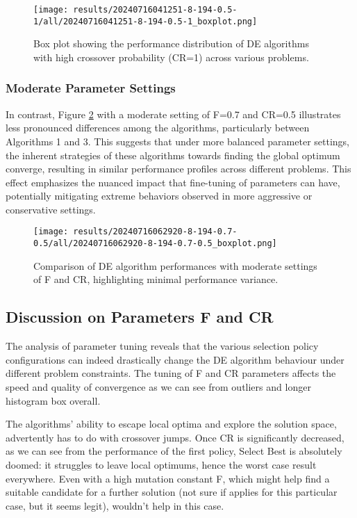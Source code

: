 \documentclass[12pt,a4paper]{article}
\begin{document}
\begin{figure}[h!]
    \centering
    \texttt{[image: results/20240716041251-8-194-0.5-1/all/20240716041251-8-194-0.5-1\_boxplot.png]}
    \caption{Box plot showing the performance distribution of DE algorithms with high crossover probability (CR=1) across various problems.}
    \label{fig:highCR}
\end{figure}

\subsubsection{Moderate Parameter Settings}
In contrast, Figure \ref{fig:moderateParams} with a moderate setting of F=0.7 and CR=0.5 illustrates less pronounced differences among the algorithms, particularly between Algorithms 1 and 3. This suggests that under more balanced parameter settings, the inherent strategies of these algorithms towards finding the global optimum converge, resulting in similar performance profiles across different problems. This effect emphasizes the nuanced impact that fine-tuning of parameters can have, potentially mitigating extreme behaviors observed in more aggressive or conservative settings.

\begin{figure}[h!]
    \centering
    \texttt{[image: results/20240716062920-8-194-0.7-0.5/all/20240716062920-8-194-0.7-0.5\_boxplot.png]}
    \caption{Comparison of DE algorithm performances with moderate settings of F and CR, highlighting minimal performance variance.}
    \label{fig:moderateParams}
\end{figure}

\subsection{Discussion on Parameters F and CR}
The analysis of parameter tuning reveals that the various selection policy configurations can indeed drastically change the DE algorithm behaviour under different problem constraints. The tuning of F and CR parameters affects the speed and quality of convergence as we can see from outliers and longer histogram box overall.

The algorithms' ability to escape local optima and explore the solution space, advertently has to do with crossover jumps. Once CR is significantly decreased, as we can see from the performance of the first policy, Select Best is absolutely doomed: it struggles to leave local optimums, hence the worst case result everywhere. Even with a high mutation constant F, which might help find a suitable candidate for a further solution (not sure if applies for this particular case, but it seems legit), wouldn't help in this case. 
\end{document}
